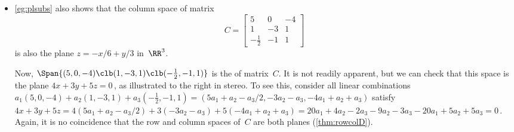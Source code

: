 \begin{example}
\begin{itemize}
\item \cref{eg:plsubs} also shows that the column space of matrix
\begin{equation*}
C=\begin{bmatrix} 5&0&-4\\1&-3&1\\-\frac12&-1&1 \end{bmatrix}
\end{equation*}
is also the plane \(z=-x/6+y/3\) in~\(\RR^3\).

\begin{figbox}{}%
Now, \(\Span\{(5,0,-4)\clb (1,-3,1)\clb (-\frac12,-1,1)\}\) is the  of matrix~\(C\).
It is not readily apparent, but we can check that this space is the plane \(4x+3y+5z=0\)\,, as illustrated to the right in stereo.
To see this, consider all linear combinations \(a_1(5,0,-4)+a_2(1,-3,1)+a_3(-\frac12,-1,1)
=(5a_1+a_2-a_3/2, -3a_2-a_3, -4a_1+a_2+a_3)\) satisfy
\(4x+3y+5z
=4(5a_1+a_2-a_3/2)+3(-3a_2-a_3)+5(-4a_1+a_2+a_3)
=20a_1+4a_2-2a_3-9a_2-3a_3-20a_1+5a_2+5a_3
=0\)\,.
Again, it is no coincidence that the row and column spaces of~\(C\) are both planes (\cref{thm:rowcolD}).

\end{figbox}
\end{itemize}
\end{example}





